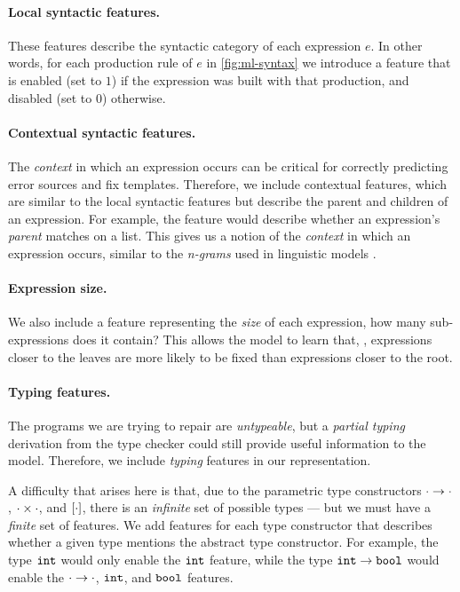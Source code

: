 \paragraph{Local syntactic features.}
These features describe the syntactic category of each expression $e$. In other
words, for each production rule of $e$ in \autoref{fig:ml-syntax} we introduce a
feature that is enabled (set to $1$) if the expression was built with that
production, and disabled (set to $0$) otherwise.

\paragraph{Contextual syntactic features.}
The \emph{context} in which an expression occurs can be critical for correctly
predicting error sources and fix templates. Therefore, we include contextual
features, which are similar to the local syntactic features but describe the
parent and children of an expression. For example, the \IsCaseListP feature
would describe whether an expression's \emph{parent} matches on a list. This
gives us a notion of the \emph{context} in which an expression occurs, similar
to the \emph{n-grams} used in linguistic models
\citep{Hindle2012-hf,Gabel2010-el}.

\paragraph{Expression size.}
We also include a feature representing the \emph{size} of each expression, \ie
how many sub-expressions does it contain? This allows the model to learn that,
\eg, expressions closer to the leaves are more likely to be fixed than
expressions closer to the root.

\paragraph{Typing features.}
The programs we are trying to repair are \emph{untypeable}, but a \emph{partial
typing} derivation from the type checker could still provide useful information
to the model. Therefore, we include \emph{typing} features in our
representation.

A difficulty that arises here is that, due to the parametric type constructors
$\cdot \to \cdot$, $\cdot \times \cdot$, and $[\cdot]$, there is an
\emph{infinite} set of possible types --- but we must have a \emph{finite} set
of features. We add features for each type constructor that describes whether a
given type mentions the abstract type constructor. For example, the type $\mathtt{int}$
would only enable the $\mathtt{int}$ feature, while the type $\mathtt{int} \to \mathtt{bool}$
would enable the $\cdot \to \cdot$, $\mathtt{int}$, and $\mathtt{bool}$ features.

